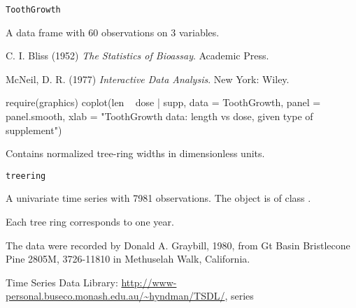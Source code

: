 %
\begin{Usage}
\begin{verbatim}
ToothGrowth
\end{verbatim}
\end{Usage}
%
\begin{Format}
A data frame with 60 observations on 3 variables.

\end{Format}
%
\begin{Source}\relax
C. I. Bliss (1952)
\emph{The Statistics of Bioassay}.
Academic Press.
\end{Source}
%
\begin{References}\relax
McNeil, D. R. (1977)
\emph{Interactive Data Analysis}.
New York: Wiley.
\end{References}
%
\begin{Examples}
\begin{ExampleCode}
require(graphics)
coplot(len ~ dose | supp, data = ToothGrowth, panel = panel.smooth,
       xlab = "ToothGrowth data: length vs dose, given type of supplement")
\end{ExampleCode}
\end{Examples}
%
\begin{Description}\relax
Contains normalized tree-ring widths in dimensionless units.
\end{Description}
%
\begin{Usage}
\begin{verbatim}
treering
\end{verbatim}
\end{Usage}
%
\begin{Format}
A univariate time series with 7981 observations. The object is of
class .

Each tree ring corresponds to one year.
\end{Format}
%
\begin{Details}\relax
The data were recorded by Donald A. Graybill, 1980, from 
Gt Basin Bristlecone Pine 2805M, 3726-11810 in Methuselah Walk, California.
\end{Details}
%
\begin{Source}\relax
Time Series Data Library:
\url{http://www-personal.buseco.monash.edu.au/~hyndman/TSDL/},
series 
\end{Source}
